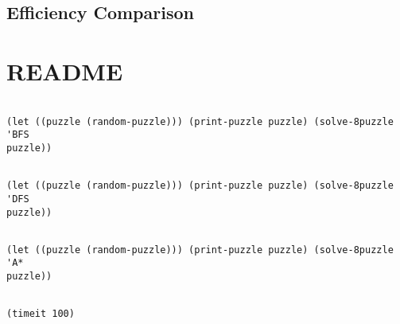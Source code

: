 \documentclass{article}
\begin{document}
\subsection{Efficiency Comparison}

\section{README} 

\begin{verbatim}

(let ((puzzle (random-puzzle))) (print-puzzle puzzle) (solve-8puzzle 'BFS
puzzle))

\end{verbatim}

\begin{verbatim}

(let ((puzzle (random-puzzle))) (print-puzzle puzzle) (solve-8puzzle 'DFS
puzzle))

\end{verbatim}

\begin{verbatim}

(let ((puzzle (random-puzzle))) (print-puzzle puzzle) (solve-8puzzle 'A*
puzzle))

\end{verbatim}

\begin{verbatim}

(timeit 100)

\end{verbatim}
\end{document}
